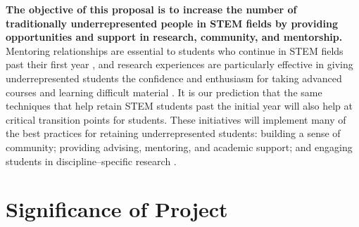 \documentclass[12pt]{article}
\begin{document}

	
{\bf The objective of this proposal is to increase the number of traditionally underrepresented people in STEM fields by providing opportunities and support in research, community, and mentorship.} Mentoring relationships are essential to students who continue in STEM fields past their first year \citep{reureport,Nagda,Wilson}, and research experiences are particularly effective in giving underrepresented students the confidence and enthusiasm for taking advanced courses and learning difficult material \citep{armstrong03}. It is our prediction that the same techniques that help retain STEM students past the initial year will also help at critical transition points for students. These initiatives will implement many of the best practices for retaining underrepresented students:  building a sense of community; providing advising, mentoring, and academic support; and engaging students in discipline--specific research \citep{jordan,holland}. 	

\section{Significance of Project}

\end{document}
